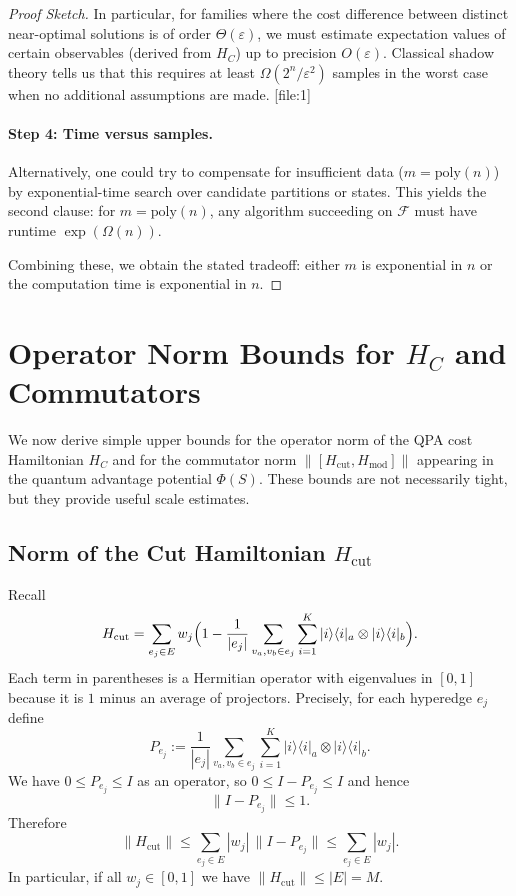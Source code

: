 \documentclass[11pt]{article}
\begin{document}
\begin{proof}[Proof Sketch]
In particular, for families where the cost difference between distinct near-optimal solutions is of order $\Theta(\varepsilon)$, we must estimate expectation values of certain observables (derived from $H_C$) up to precision $O(\varepsilon)$. Classical shadow theory tells us that this requires at least $\Omega(2^n/\varepsilon^2)$ samples in the worst case when no additional assumptions are made. [file:1]

\paragraph{Step 4: Time versus samples.}
Alternatively, one could try to compensate for insufficient data ($m = \mathrm{poly}(n)$) by exponential-time search over candidate partitions or states. This yields the second clause: for $m = \mathrm{poly}(n)$, any algorithm succeeding on $\mathcal{F}$ must have runtime $\exp(\Omega(n))$.

Combining these, we obtain the stated tradeoff: either $m$ is exponential in $n$ or the computation time is exponential in $n$.
\end{proof}

\section{Operator Norm Bounds for $H_C$ and Commutators}
\label{app:norm-bounds}

We now derive simple upper bounds for the operator norm of the QPA cost Hamiltonian $H_C$ and for the commutator norm $\|[H_{\text{cut}},H_{\text{mod}}]\|$ appearing in the quantum advantage potential $\Phi(S)$. These bounds are not necessarily tight, but they provide useful scale estimates.

\subsection{Norm of the Cut Hamiltonian $H_{\text{cut}}$}

Recall
\[
  H_{\text{cut}} = \sum_{e_j\in E} w_j \Bigl(1 - \frac{1}{|e_j|} \sum_{v_a,v_b\in e_j}\sum_{i=1}^K |i\rangle\langle i|_a\otimes|i\rangle\langle i|_b \Bigr).
\]
Each term in parentheses is a Hermitian operator with eigenvalues in $[0,1]$ because it is $1$ minus an average of projectors. Precisely, for each hyperedge $e_j$ define
\[
  P_{e_j} := \frac{1}{|e_j|} \sum_{v_a,v_b\in e_j}\sum_{i=1}^K |i\rangle\langle i|_a\otimes|i\rangle\langle i|_b.
\]
We have $0 \le P_{e_j} \le I$ as an operator, so $0\le I - P_{e_j}\le I$ and hence
\[
  \|I-P_{e_j}\| \le 1.
\]
Therefore
\[
  \|H_{\text{cut}}\|
    \le \sum_{e_j\in E} |w_j| \,\|I-P_{e_j}\|
    \le \sum_{e_j\in E} |w_j|.
\]
In particular, if all $w_j \in [0,1]$ we have $\|H_{\text{cut}}\|\le |E| = M$.
\end{document}
